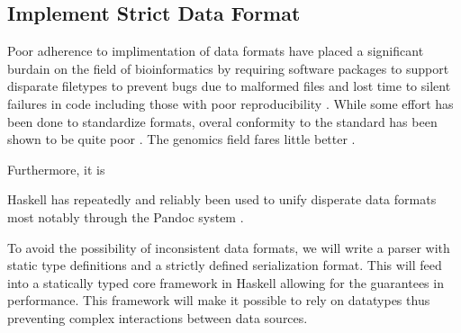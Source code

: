 \documentclass[11pt,letterpaper]{article}
\begin{document}

\subsection{Implement Strict Data Format}

Poor adherence to implimentation of data formats
have %
placed a significant burdain on the field of bioinformatics by
requiring software packages to support disparate filetypes to prevent
bugs due to malformed files and lost time to silent failures in code
including those with poor reproducibility
\parencite{natella2018analyzing}. While some effort has been done to
standardize formats, overal conformity to the standard has been shown
to be quite poor \parencites{spidlen2010data, spidlen2021data,
  bray2012fcs, bras2020robust}. The genomics field fares little better
\parencites{greenfield2019importance, gopalacceleration,
  alberti2018introduction, endrullat2016standardization,
  piccolo2021simplifying}.

Furthermore, it is 

Haskell has repeatedly and reliably been used to unify disperate data formats most notably through the Pandoc system \parencite{krijnen2014expand}.

To avoid the possibility of inconsistent data formats, we will write a
parser with static type definitions and a strictly defined
serialization format. This will feed into a statically typed core
framework in Haskell allowing for the guarantees in performance. This
framework will make it possible to rely on datatypes thus preventing
complex interactions between data sources.

\end{document}
